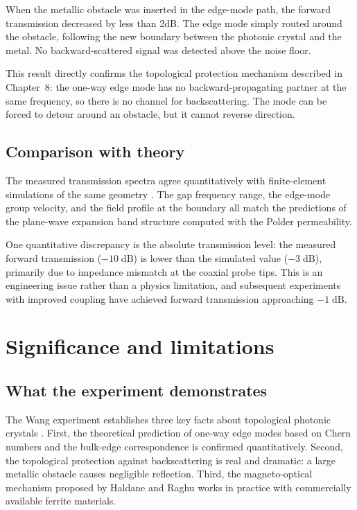 When the metallic obstacle was inserted in the edge-mode path, the
forward transmission decreased by less than 2\;dB.  The edge mode
simply routed around the obstacle, following the new boundary between
the photonic crystal and the metal.  No backward-scattered signal was
detected above the noise floor.

This result directly confirms the topological protection mechanism
described in Chapter~8: the one-way edge mode has no backward-propagating
partner at the same frequency, so there is no channel for
backscattering.  The mode can be forced to detour around an obstacle,
but it cannot reverse direction.

\subsection{Comparison with theory}
\label{sec:ch9-comparison}

The measured transmission spectra agree quantitatively with
finite-element simulations of the same geometry
\cite{ozawa2018topological}.  The gap frequency
range, the edge-mode group velocity, and the field profile at the
boundary all match the predictions of the plane-wave expansion
band structure computed with the Polder permeability.

One quantitative discrepancy is the absolute transmission level: the
measured forward transmission ($-10\;\mathrm{dB}$) is lower than the
simulated value ($-3\;\mathrm{dB}$), primarily due to impedance
mismatch at the coaxial probe tips.  This is an engineering issue
rather than a physics limitation, and subsequent experiments with
improved coupling have achieved forward transmission approaching
$-1\;\mathrm{dB}$.

\section{Significance and limitations}
\label{sec:ch9-significance}

\subsection{What the experiment demonstrates}
\label{sec:ch9-demonstrates}

The Wang experiment establishes three key facts about topological
photonic crystals \cite{nature2026observation,haldane2008possible}.  First, the theoretical prediction of one-way edge
modes based on Chern numbers and the bulk-edge correspondence is
confirmed quantitatively.  Second, the topological protection against
backscattering is real and dramatic: a large metallic obstacle causes
negligible reflection.  Third, the magneto-optical mechanism proposed by
Haldane and Raghu works in practice with commercially available ferrite
materials.

